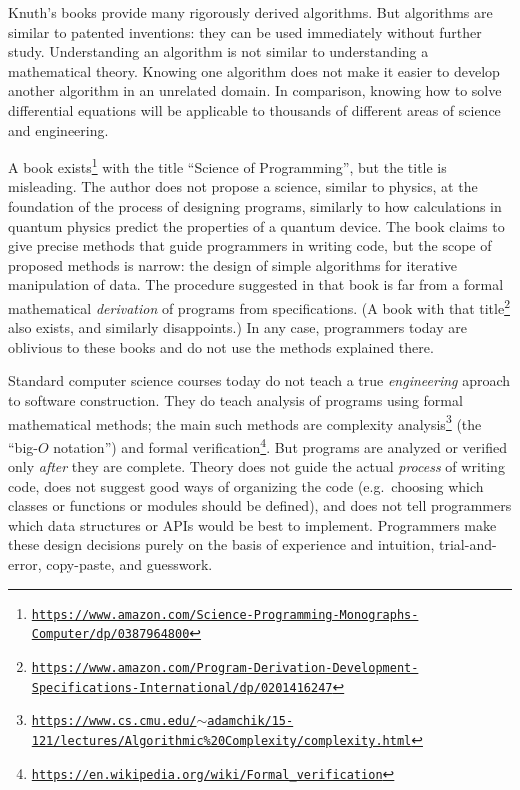 Knuth's books provide many rigorously derived algorithms. But algorithms
are similar to patented inventions: they can be used immediately without
further study. Understanding an algorithm is not similar to understanding
a mathematical theory. Knowing one algorithm does not make it easier
to develop another algorithm in an unrelated domain. In comparison,
knowing how to solve differential equations will be applicable to
thousands of different areas of science and engineering.

A book exists\footnote{\texttt{\href{https://www.amazon.com/Science-Programming-Monographs-Computer/dp/0387964800}{https://www.amazon.com/Science-Programming-Monographs-Computer/dp/0387964800}}}
with the title ``Science of Programming'', but the title is misleading.
The author does not propose a science, similar to physics, at the
foundation of the process of designing programs, similarly to how
calculations in quantum physics predict the properties of a quantum
device. The book claims to give precise methods that guide programmers
in writing code, but the scope of proposed methods is narrow: the
design of simple algorithms for iterative manipulation of data. The
procedure suggested in that book is far from a formal mathematical
\emph{derivation} of programs from specifications. (A book with that
title\footnote{\texttt{\href{https://www.amazon.com/Program-Derivation-Development-Specifications-International/dp/0201416247}{https://www.amazon.com/Program-Derivation-Development-Specifications-International/dp/0201416247}}}
also exists, and similarly disappoints.) In any case, programmers
today are oblivious to these books and do not use the methods explained
there.

Standard computer science courses today do not teach a true \emph{engineering}
aproach to software construction. They do teach analysis of programs
using formal mathematical methods; the main such methods are complexity
analysis\footnote{\texttt{\href{https://www.cs.cmu.edu/~adamchik/15-121/lectures/Algorithmic\%20Complexity/complexity.html}{https://www.cs.cmu.edu/$\sim$adamchik/15-121/lectures/Algorithmic\%20Complexity/complexity.html}}}
(the ``big-$O$ notation'') and formal verification\footnote{\texttt{\href{https://en.wikipedia.org/wiki/Formal_verification}{https://en.wikipedia.org/wiki/Formal\_verification}}}.
But programs are analyzed or verified only \emph{after} they are complete.
Theory does not guide the actual \emph{process} of writing code, does
not suggest good ways of organizing the code (e.g.~choosing which
classes or functions or modules should be defined), and does not tell
programmers which data structures or APIs would be best to implement.
Programmers make these design decisions purely on the basis of experience
and intuition, trial-and-error, copy-paste, and guesswork. 

